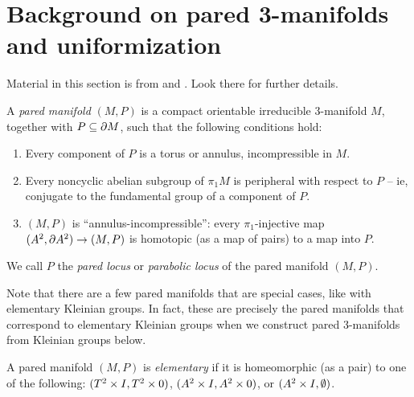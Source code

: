 \section{Background on pared 3-manifolds and uniformization}

Material in this section is from \cite{Mo} and \cite{CMc}. Look there for
further details.

%
\begin{defn}

A \emph{pared manifold} $(M,P)$ is a compact orientable irreducible 3-manifold
$M$, together with $P\subseteq\partial M$, such that the following conditions hold:

\begin{enumerate}
\item Every component of $P$ is a torus or annulus, incompressible in $M$.

\item Every noncyclic abelian subgroup of $\pi_1M$ is peripheral with respect
to $P$ -- ie, conjugate to the fundamental group of a component of $P$.

\item $(M,P)$ is ``annulus-incompressible'': every $\pi_1$-injective map $(A^2,
\partial A^2) \to (M,P)$ is homotopic (as a map of pairs) to a map into $P$.

\end{enumerate}

We call $P$ the \emph{pared locus} or \emph{parabolic locus} of the pared
manifold $(M,P)$.

\end{defn}

Note that there are a few pared manifolds that are special cases, like with
elementary Kleinian groups. In fact, these are precisely the pared manifolds
that correspond to elementary Kleinian groups when we construct pared
3-manifolds from Kleinian groups below.

\begin{defn}

A pared manifold $(M,P)$ is \emph{elementary} if it is homeomorphic (as a pair)
to one of the following: $(T^2\times I,T^2\times 0)$, $(A^2\times I,A^2\times 0)$, or $(A^2\times
I,\emptyset)$.

\end{defn}


